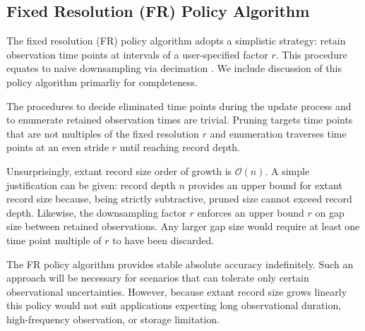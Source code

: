 \subsection{Fixed Resolution (FR) Policy Algorithm}
\label{sec:fixed-resolution-algo}

The fixed resolution (FR) policy algorithm adopts a simplistic strategy: retain observation time points at intervals of a user-specified factor $r$.
This procedure equates to naive downsampling via decimation \citep[p. 31]{crochiere1983multirate}.
We include discussion of this policy algorithm primarliy for completeness.

The procedures to decide eliminated time points during the update process and to enumerate retained observation times are trivial.
Pruning targets time points that are not multiples of the fixed resolution $r$ and enumeration traverses time points at an even stride $r$ until reaching record depth.

Unsurprisingly, extant record size order of growth is $\mathcal{O}(n)$.
A simple justification can be given: record depth $n$ provides an upper bound for extant record size because, being strictly subtractive, pruned size cannot exceed record depth.
Likewise, the downsampling factor $r$ enforces an upper bound $r$ on gap size between retained observations.
Any larger gap size would require at least one time point multiple of $r$ to have been discarded.
% 
% 

The FR policy algorithm provides stable absolute accuracy indefinitely.
Such an approach will be necessary for scenarios that can tolerate only certain observational uncertainties.
However, because extant record size grows linearly this policy would not suit applications expecting long observational duration, high-frequency observation, or storage limitation.

% 
% 
